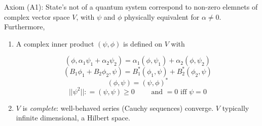 \documentclass[a4paper]{article}
\begin{document}
Axiom (A1): State's not of a quantum system correspond to non-zero elemnets of complex vector space $ V $, with $ \psi $ and $ \phi $ physically equivalent for $ \alpha \neq 0 $. Furthermore, 
\begin{enumerate}
	\item A complex inner product $ (\psi,\phi) $ is defined on $ V $ with 
	
	\[ (\phi, \alpha_{1} \psi_{1} + \alpha_{2} \psi_{2}) = \alpha_{1} (\phi,\psi_{1}) + \alpha_{2}(\phi,\psi_{2})  \]
	\[ (B_{1}\phi_{1} + B_{2} \phi_{2}, \psi) = B_{1}^{*}(\phi_{1},\psi) + B_{2}^{*} (\phi_{2},\psi) \]
	\[ (\phi,\psi) = (\psi,\phi)^{*} \]
	\[ | | \psi^{2}  | | : = (\psi,\psi) \geq 0 \qquad \text{ and } =0 \text{ iff } \psi = 0 \]
	
	\item $ V $ is \emph{complete}: well-behaved series (Cauchy sequences) converge. $ V $ typically infinite dimensional, a Hilbert space.
	
\end{enumerate}









  
\end{document}
